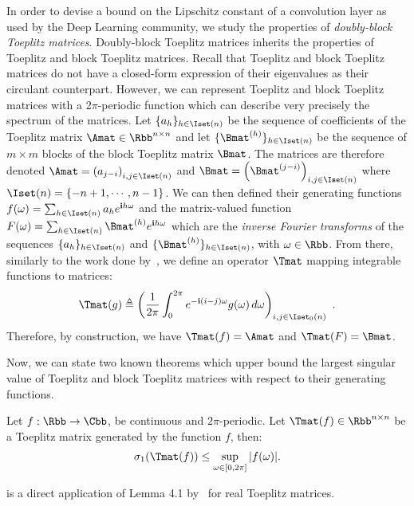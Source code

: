 In order to devise a bound on the Lipschitz constant of a convolution layer as used by the Deep Learning community, we study the properties of \emph{doubly-block Toeplitz matrices}. 
Doubly-block Toeplitz matrices inherits the properties of Toeplitz and block Toeplitz matrices.
Recall that Toeplitz and block Toeplitz matrices do not have a closed-form expression of their eigenvalues as their circulant counterpart.
However, we can represent Toeplitz and block Toeplitz matrices with a 2$\pi$-periodic function which can describe very precisely the spectrum of the matrices. 
Let $\{a_h\}_{h \in \Iset(n)}$ be the sequence of coefficients of the Toeplitz matrix $\Amat \in \Rbb^{n\times n}$ and let $\{\Bmat^{(h)}\}_{h \in \Iset(n)}$ be the sequence of $m\times m$ blocks of the block Toeplitz matrix $\Bmat$.
The matrices are therefore denoted $\Amat = \leftmat a_{j-i} \rightmat_{i,j \in \Iset(n)}$ and $\Bmat = \leftmat \Bmat^{(j-i)} \rightmat_{i,j \in \Iset(n)}$ where $\Iset(n) = \left\{ -n+1, \cdots, n-1 \right\}$.
We can then defined their generating functions $f(\omega) = \sum_{h \in \Iset(n)} a_h e^{\ci h \omega}$ and the matrix-valued function $F(\omega) = \sum_{h \in \Iset(n)} \Bmat^{(h)} e^{\ci h \omega}$ which are the \emph{inverse Fourier transforms} of the sequences $\{a_h\}_{h \in \Iset(n)}$ and $\{\Bmat^{(h)}\}_{h \in \Iset(n)}$, with $\omega \in \Rbb$.
From there, similarly to the work done by~\citet{grenander1958toeplitz}, we define an operator $\Tmat$ mapping integrable functions to matrices:
\begin{equation} \label{equation:expression_toeplitz_matrix}
  \Tmat(g)  \triangleq\leftmat\frac{1}{2\pi}\int_{0}^{2\pi}e^{-\ci(i-j)\omega}g(\omega)\,d\omega\rightmat_{i,j \in \Iset_0(n)} \enspace.
\end{equation}
Therefore, by construction, we have $\Tmat(f) = \Amat$ and $\Tmat(F) = \Bmat$.

Now, we can state two known theorems which upper bound the largest singular value of Toeplitz and block Toeplitz matrices with respect to their generating functions.
\begin{theorem} \label{theorem:teoplitz_sup_singular}
  Let $f: \Rbb \rightarrow \Cbb$, be continuous and $2\pi$-periodic. Let $\Tmat(f) \in \Rbb^{n \times n}$ be a Toeplitz matrix generated by the function $f$, then:
  \begin{align}
    \sigma_1 \left( \Tmat(f) \right) \leq \sup_{\omega \in [0, 2\pi]} |f(\omega)|.
  \end{align}
  \removespace
\end{theorem}
\noindent
{} is a direct application of  Lemma 4.1 by~\citet{gray2006toeplitz} for real Toeplitz matrices. 

